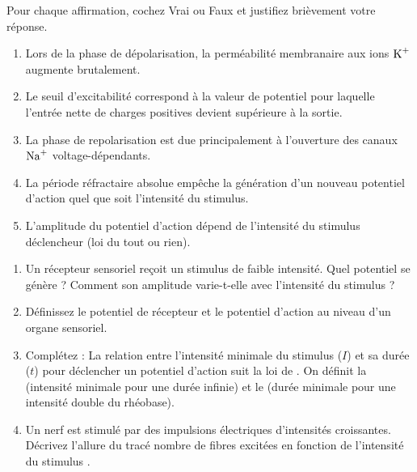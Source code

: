 \documentclass[11pt]{article}
\begin{document}
\begin{exercice}
\noindent Pour chaque affirmation, cochez Vrai ou Faux et justifiez brièvement votre réponse.
\begin{enumerate}
    \item Lors de la phase de dépolarisation, la perméabilité membranaire aux ions $\ce{K+}$ augmente brutalement.
    \item Le seuil d'excitabilité correspond à la valeur de potentiel pour laquelle l'entrée nette de charges positives devient supérieure à la sortie.
    \item La phase de repolarisation est due principalement à l'ouverture des canaux $\ce{Na+}$ voltage-dépendants.
    \item La période réfractaire absolue empêche la génération d'un nouveau potentiel d'action quel que soit l'intensité du stimulus.
    \item L'amplitude du potentiel d'action dépend de l'intensité du stimulus déclencheur (loi du tout ou rien).
\end{enumerate}
\end{exercice}

\begin{exercice}
\begin{enumerate}
    \item Un récepteur sensoriel reçoit un stimulus de faible intensité. Quel potentiel se génère ? Comment son amplitude varie-t-elle avec l'intensité du stimulus ?
    \item Définissez le \og potentiel de récepteur \fg et le \og potentiel d'action \fg au niveau d'un organe sensoriel.
    \item Complétez : La relation entre l'intensité minimale du stimulus ($I$) et sa durée ($t$) pour déclencher un potentiel d'action suit la loi de \underline{\hspace{3cm}}. On définit la \underline{\hspace{3cm}} (intensité minimale pour une durée infinie) et le \underline{\hspace{3cm}} (durée minimale pour une intensité double du rhéobase).
    \item Un nerf est stimulé par des impulsions électriques d'intensités croissantes. Décrivez l'allure du tracé \og nombre de fibres excitées en fonction de l'intensité du stimulus \fg.
\end{enumerate}
\end{exercice}
\end{document}
